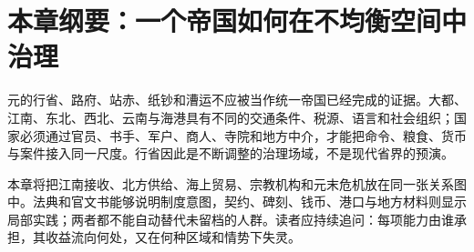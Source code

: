 \section{本章纲要：一个帝国如何在不均衡空间中治理}

元的行省、路府、站赤、纸钞和漕运不应被当作统一帝国已经完成的证据。大都、江南、东北、西北、云南与海港具有不同的交通条件、税源、语言和社会组织；国家必须通过官员、书手、军户、商人、寺院和地方中介，才能把命令、粮食、货币与案件接入同一尺度。行省因此是不断调整的治理场域，不是现代省界的预演。

本章将把江南接收、北方供给、海上贸易、宗教机构和元末危机放在同一张关系图中。法典和官文书能够说明制度意图，契约、碑刻、钱币、港口与地方材料则显示局部实践；两者都不能自动替代未留档的人群。读者应持续追问：每项能力由谁承担，其收益流向何处，又在何种区域和情势下失灵。
